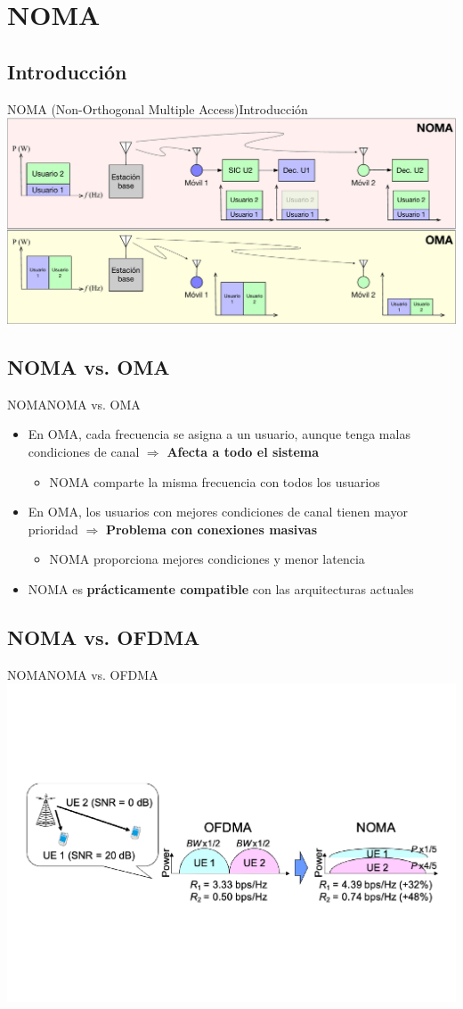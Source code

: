 \documentclass[10pt,compress]{beamer} %
\begin{document}
\section{NOMA}
\subsection{Introducción}
\begin{frame}{NOMA (Non-Orthogonal Multiple Access)}{Introducción}
  \centering \includegraphics[width=0.8\linewidth]{../Apuntes/Figuras/NOMA.pdf}
\end{frame}

\subsection{NOMA vs. OMA}
\begin{frame}{NOMA}{NOMA vs. OMA}
  \begin{itemize}
    \item En OMA, cada frecuencia se asigna a un usuario, aunque tenga malas condiciones de canal $\Rightarrow$ {\bf Afecta a todo el sistema}
    \begin{itemize}
      \item NOMA comparte la misma frecuencia con todos los usuarios
    \end{itemize}
    \item En OMA, los usuarios con mejores condiciones de canal tienen mayor prioridad $\Rightarrow$ {\bf Problema con conexiones masivas}
    \begin{itemize}
      \item NOMA proporciona mejores condiciones y menor latencia
    \end{itemize}
    \item NOMA es {\bf prácticamente compatible} con las arquitecturas actuales
  \end{itemize}
\end{frame}


\subsection{NOMA vs. OFDMA}
\begin{frame}{NOMA}{NOMA vs. OFDMA}
  \centering \includegraphics[width=0.8\linewidth]{../Apuntes/Figuras/NOMA_OFDMA.pdf}
\end{frame}
\end{document}
